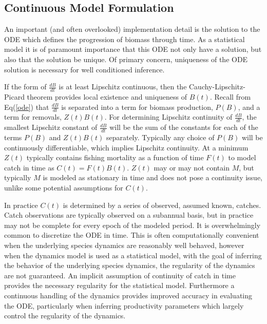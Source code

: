 %
\subsection{Continuous Model Formulation}

%
An important (and often overlooked) implementation detail is the solution to the
ODE which defines the progression of biomass through time. %
As a statistical model it is of paramount importance that this ODE not only have a
solution, but also that the solution be unique. Of primary concern, uniqueness
of the ODE solution is necessary for well conditioned inference. %

%
If the form of $\frac{dB}{dt}$ is at least Lipschitz continuous, then the
Cauchy-Lipschitz-Picard theorem provides local existence and uniqueness of
$B(t)$. %
Recall from Eq(\ref{ode}) that $\frac{dB}{dt}$ is separated into
a term for biomass production, $P(B)$, and a term for removals, $Z(t)B(t)$.
For determining Lipschitz continuity of $\frac{dB}{dt}$,
the smallest Lipschitz constant of $\frac{dB}{dt}$ will be the sum of the
constants for each of the terms $P(B)$ and $Z(t)B(t)$ separately. Typically any
choice of $P(B)$ will be continuously differentiable, which implies Lipschitz
continuity. %
At a minimum $Z(t)$ typically contains fishing mortality as a function of time
$F(t)$ to model catch in time as $C(t)=F(t)B(t)$. $Z(t)$ may or may not contain
$M$, but typically $M$ is modeled as stationary in time and does not pose a
continuity issue, unlike some potential assumptions for $C(t)$.

%
In practice $C(t)$ is determined by a series of observed, assumed known, catches.
Catch observations are typically observed on a subannual basis, but
in practice may not be complete for every epoch of the modeled
period. It is overwhelmingly common to discretize the ODE in time. 
This is often computationally convenient when the underlying species
dynamics are reasonably well behaved, however when the dynamics model is used
as a statistical model, with the goal of inferring the behavior of the
underlying species dynamics, the regularity of the dynamics are not guaranteed.
An implicit assumption of continuity of catch in time provides the necessary
regularity for the statistical model. Furthermore a continuous handling of the
dynamics provides improved accuracy in evaluating the ODE, particularly when
inferring productivity parameters which largely control the regularity of the
dynamics.


